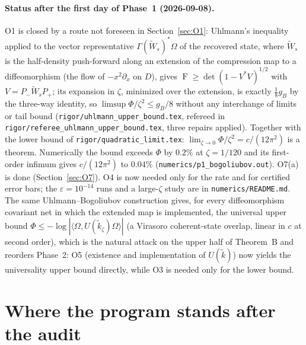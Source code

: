 \documentclass[11pt]{article}
\theoremstyle{accent}
\theoremstyle{definition}
\newcommand{\eps}{\varepsilon}
\newcommand{\Fid}{\operatorname{F}}
\begin{document}
\paragraph{Status after the first day of Phase~1 (2026-09-08).} O1 is closed by a route not foreseen in Section~\ref{sec:O1}: Uhlmann's inequality applied to the vector representative \(\Gamma(\widetilde W_s)^*\Omega\) of the recovered state, where \(\widetilde W_s\) is the half-density push-forward along an extension of the compression map to a diffeomorphism (the flow of \(-x^2\partial_x\) on \(D\)), gives \(\Fid\ge\det(1-V^*V)^{1/2}\) with \(V=P_-\widetilde W_sP_+\); its expansion in \(\zeta\), minimized over the extension, is exactly \(\tfrac18g_B\) by the three-way identity, so \(\limsup\Phi/\zeta^2\le g_B/8\) without any interchange of limits or tail bound (\texttt{rigor/uhlmann\_upper\_bound.tex}, refereed in \texttt{rigor/referee\_uhlmann\_upper\_bound.tex}, three repairs applied).  Together with the lower bound of \texttt{rigor/quadratic\_limit.tex}: \(\lim_{\zeta\to0}\Phi/\zeta^2=c/(12\pi^2)\) is a theorem.  Numerically the bound exceeds \(\Phi\) by \(0.2\%\) at \(\zeta=1/120\) and its first-order infimum gives \(c/(12\pi^2)\) to \(0.04\%\) (\texttt{numerics/p1\_bogoliubov.out}).  O7(a) is done (Section~\ref{sec:O7}).  O4 is now needed only for the rate and for certified error bars; the \(\eps=10^{-14}\) runs and a large-\(\zeta\) study are in \texttt{numerics/README.md}.  The same Uhlmann--Bogoliubov construction gives, for every diffeomorphism covariant net in which the extended map is implemented, the universal upper bound \(\Phi\le-\log|\langle\Omega,U(\widetilde k_\zeta)\Omega\rangle|\) (a Virasoro coherent-state overlap, linear in \(c\) at second order), which is the natural attack on the upper half of Theorem~B and reorders Phase~2: O5 (existence and implementation of \(U(\widetilde k)\)) now yields the universality upper bound directly, while O3 is needed only for the lower bound.

\tableofcontents
\clearpage

\section{Where the program stands after the audit}\label{sec:status}
\end{document}
